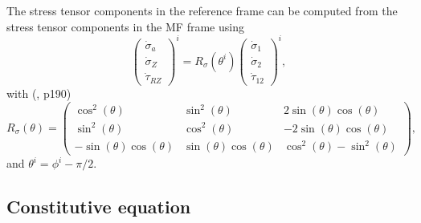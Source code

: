 \documentclass[]{article}
\begin{document}
The stress tensor components in the reference frame can be computed from the stress tensor components in the MF frame using 
\begin{equation}
	\boxed{
	\left(\begin{matrix}
		\dot{\sigma}_a\\
		\dot{\sigma}_Z\\
		\dot{\tau}_{RZ}
	\end{matrix}\right)^i
	=
R_{\sigma}(\theta^i)
	\left(\begin{matrix}
	\dot{\sigma}_1\\
	\dot{\sigma}_2\\
	\dot{\tau}_{12}
\end{matrix}\right)^i},
\end{equation}
with (\citet{aga17}, p190) 
\begin{equation}
	R_{\sigma}(\theta)
	=
	\left(\begin{matrix}
		\cos^2(\theta) & \sin^2(\theta) & 2\sin(\theta)\cos(\theta)\\
		\sin^2(\theta) & \cos^2(\theta) & -2\sin(\theta)\cos(\theta)\\
		-\sin(\theta)\cos(\theta) & \sin(\theta)\cos(\theta) & \cos^2(\theta)-\sin^2(\theta)
	\end{matrix}\right)
	,
\end{equation}
and $\theta^i=\phi^i-\pi/2$.
\subsection{Constitutive equation}
\end{document}
